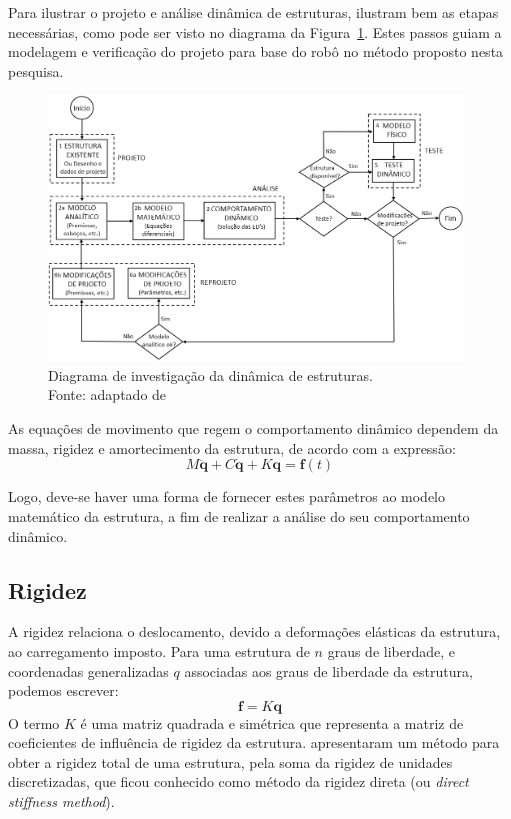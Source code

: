 Para ilustrar o projeto e análise dinâmica de estruturas,
\citet{craig2006fundamentals} ilustram bem as etapas necessárias, como pode ser
visto no diagrama da Figura~\ref{fig::analise_estrut}. Estes passos guiam a
modelagem e verificação do projeto para base do robô no método proposto nesta
pesquisa.

\begin{figure}[h]
	\centering 
 	\includegraphics[width=0.98\textwidth]{figs/analise_estrut}
 	\caption[Diagrama de investigação da dinâmica de estruturas]{Diagrama de
 	investigação da dinâmica de estruturas. \\Fonte:
 	adaptado de \cite{craig2006fundamentals}}
 	\label{fig::analise_estrut}
\end{figure}

As equações de movimento que regem o comportamento dinâmico dependem da massa,
rigidez e amortecimento da estrutura, de acordo com a expressão:
%
\begin{equation} \label{eq::eqmov_structural}
	M \ddot{\mathbf{q}} + C \dot{\mathbf{q}} + K \mathbf{q} = \mathbf{f}(t)
\end{equation}
%

Logo, deve-se haver uma forma de fornecer estes parâmetros ao modelo matemático
da estrutura, a fim de realizar a análise do seu comportamento dinâmico.


\subsection{Rigidez} \label{sec::rigidez}

A rigidez relaciona o deslocamento, devido a deformações elásticas da estrutura,
ao carregamento imposto.
Para uma estrutura de $n$ graus de liberdade, e coordenadas generalizadas $q$
associadas aos graus de liberdade da estrutura, podemos escrever:
%
\begin{equation} \label{eq::rigidez}
	\mathbf{f} = K \mathbf{q}
\end{equation}
%
O termo $K$ é uma matriz quadrada e simétrica que representa a matriz de
coeficientes de influência de rigidez da estrutura.
\citet{turner23stiffness} apresentaram um método para obter a rigidez total de
uma estrutura, pela soma da rigidez de unidades discretizadas, que ficou
conhecido como método da rigidez direta (ou \textit{direct stiffness method}).

